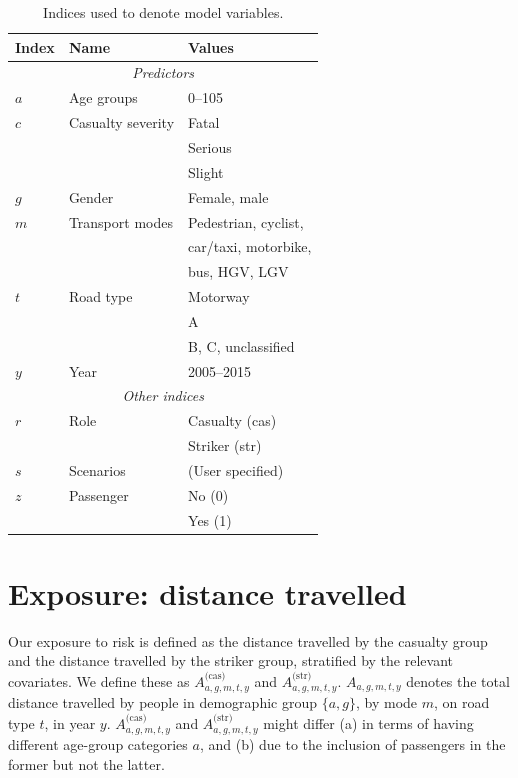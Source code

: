 \documentclass{article}
\begin{document}
\begin{table}[ht]
\begin{center}
\caption{Indices used to denote model variables.}
\begin{tabular}{lll}
\label{indices}
Index & Name & Values \\
\hline
\multicolumn{3}{c}{\textit{Predictors}}\\
\hline
$a$ & Age groups & 0--105\\
$c$ & Casualty severity & Fatal \\
& & Serious \\
& & Slight \\
$g$ & Gender & Female, male \\
$m$ & Transport modes& Pedestrian, cyclist,\\
& & car/taxi, motorbike, \\
& & bus, HGV, LGV \\
$t$ & Road type & Motorway \\
& & A \\
& & B, C, unclassified \\
$y$ & Year & 2005--2015\\
\hline
\multicolumn{3}{c}{\textit{Other indices}}\\
\hline
$r$& Role & Casualty (cas) \\
& & Striker (str) \\
$s$ & Scenarios & (User specified)\\
$z$ & Passenger& No (0) \\
& & Yes (1) \\
\hline
\end{tabular}
\end{center}
\end{table}


\section{Exposure: distance travelled}\label{exp}

Our exposure to risk is defined as the distance travelled by the casualty group and the distance travelled by the striker group, stratified by the relevant covariates. We define these as $A_{a,g,m,t,y}^{\text{(cas)}}$ and $A_{a,g,m,t,y}^{\text{(str)}}$. $A_{a,g,m,t,y}$ denotes the total distance travelled by people in demographic group $\{a,g\}$, by mode $m$, on road type $t$, in year $y$. $A_{a,g,m,t,y}^{\text{(cas)}}$ and $A_{a,g,m,t,y}^{\text{(str)}}$ might differ (a) in terms of having different age-group categories $a$, and (b) due to the inclusion of passengers in the former but not the latter. 
\end{document}
